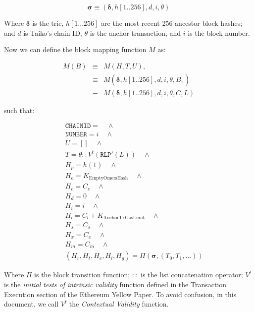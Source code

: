 \documentclass[9pt,oneside]{amsart}
\begin{document}
\begin{multicols}{2}
$$\boldsymbol{\sigma} \equiv (\boldsymbol{\delta}, h[1..256], d, i, \theta)$$

Where $\boldsymbol{\delta}$ is the trie, $h[1...256]$ are the most recent 256 ancestor block hashes; and $d$ is Taiko's chain ID, $\theta$ is the anchor transaction, and $i$ is the block number.

Now we can define the block mapping function $M$ as:

\begin{eqnarray}
M(B) & \equiv & M(H, T, U), \\
\nonumber & \equiv &  M(\boldsymbol{\delta}, h[1..256], {d}, i, \theta, \dot{B}, )  \\
\nonumber & \equiv & M(\boldsymbol{\delta}, h[1..256], {d}, i, \theta, C, L)
\end{eqnarray}


such that:

\begin{eqnarray}
& & \texttt{CHAINID}  = \quad \wedge \\
\nonumber& & \texttt{NUMBER} = {i} \quad \wedge \\
\nonumber& & U = [] \quad \wedge \\
\nonumber& & T =  \theta::V^t(\texttt{RLP}'(L)) \quad \wedge  \\
\nonumber& & H_p =  h(1) \quad \wedge \\
\nonumber& & H_o =   K_{\mathrm{EmptyOmersHash}} \quad \wedge \\
\nonumber& & H_c =   C_c \quad \wedge \\
\nonumber& & H_d =   0 \quad \wedge \\
\nonumber& & H_i =   i \quad \wedge \\
\nonumber& & H_l =   C_l + K_{\mathrm{AnchorTxGasLimit}} \quad \wedge \\
\nonumber& & H_s =   C_s \quad \wedge \\
\nonumber& & H_x =   C_x \quad \wedge \\
\nonumber& & H_m =   C_m \quad \wedge \\
\nonumber& & (H_r, H_t, H_e, H_l, H_g) =   \Pi(\boldsymbol{\sigma}, (T_0, T_1, ...))
\end{eqnarray}

Where $\Pi$ is the block transition function; $::$ is the list concatenation operator; $V^t$ is the \textit{initial tests of intrinsic validity} function defined in the Transaction Execution section of the Ethereum Yellow Paper. To avoid confusion, in this document, we call $V^t$ the \textit{Contextual Validity } function.


\end{multicols}
\end{document}
